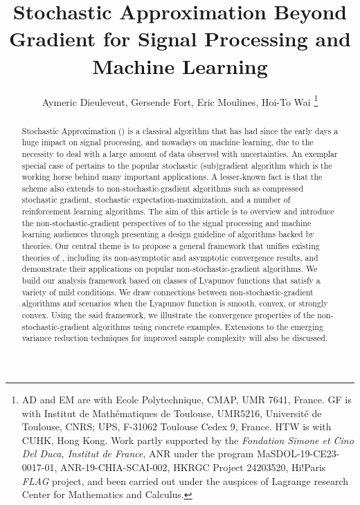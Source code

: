 \documentclass[10pt,twocolumn,twoside]{IEEEtran}
\begin{document}
\title{Stochastic Approximation Beyond Gradient for Signal Processing and Machine Learning}
\author{Aymeric Dieuleveut, Gersende Fort, Eric Moulines, Hoi-To Wai
\thanks{AD and EM are with Ecole Polytechnique, CMAP, UMR 7641, France. GF is with Institut de Mathématiques de Toulouse, UMR5216, Université de Toulouse,  CNRS; UPS, F-31062 Toulouse Cedex 9, France. HTW is with CUHK, Hong Kong. 
Work partly supported by the {\it Fondation Simone et Cino Del Duca, Institut de France}, ANR under the program MaSDOL-19-CE23-0017-01, ANR-19-CHIA-SCAI-002, HKRGC Project 24203520, Hi!Paris \textit{FLAG} project, and been carried out under the auspices of Lagrange research Center for Mathematics and Calculus. 
}
}

{\let\newpage\relax\maketitle}

\begin{abstract}
    Stochastic Approximation ({\SA}) is a classical algorithm that has had since the early days a huge impact on signal processing, and nowadays on machine learning, due to the necessity to deal with a large amount of data observed with uncertainties. An exemplar special case of {\SA} pertains to the popular stochastic (sub)gradient  algorithm which is the working horse behind many important applications. A lesser-known fact is that the {\SA} scheme also extends to non-stochastic-gradient algorithms such as compressed stochastic gradient, stochastic expectation-maximization, and a number of reinforcement learning algorithms. The aim of this article is to overview and introduce the non-stochastic-gradient perspectives of {\SA} to the signal processing and machine learning audiences through presenting a design guideline of {\SA} algorithms backed by theories. Our central theme is to propose a general framework that unifies existing theories of {\SA}, including its non-asymptotic and asymptotic convergence results, and demonstrate their applications on popular non-stochastic-gradient algorithms. We build our analysis framework based on classes of Lyapunov functions that satisfy a variety of mild conditions. We draw connections between non-stochastic-gradient algorithms and scenarios when the Lyapunov function is smooth, convex, or strongly convex. Using the said framework, we illustrate the convergence properties of the non-stochastic-gradient algorithms using concrete examples. Extensions to the emerging variance reduction techniques for improved sample complexity will also be discussed.  
\end{abstract}
\end{document}
